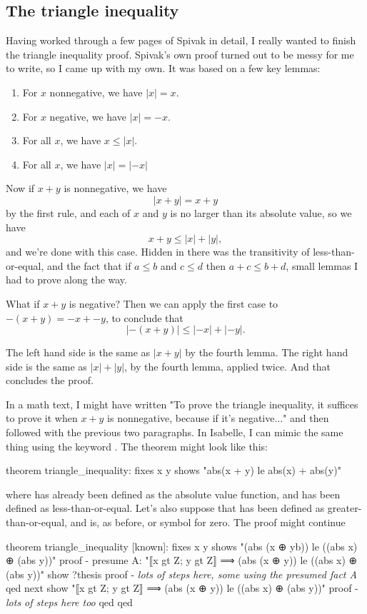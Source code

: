 \subsection{The triangle inequality}
Having worked through a few pages of Spivak in detail, I really wanted to finish the triangle inequality proof. Spivak's own proof turned out to be messy for me to write, so I came up with my own. It was based on a few key lemmas: 
\begin{enumerate}
    \item For $x$ nonnegative, we have $|x| = x$.
    \item For $x$ negative, we have $|x| = -x$.
    \item For all $x$, we have $x \le |x|$.
    \item For all $x$, we have $|x| = |-x|$
\end{enumerate}
Now if $x+y$ is nonnegative, we have
$$
|x+y| = x + y
$$
by the first rule, and each of $x$ and $y$ is no larger than its absolute value, so we have $$
x + y \le |x| + |y|,$$
and we're done with this case. Hidden in there was the transitivity of less-than-or-equal, and the fact that if $a \le b$ and $c \le d$ then $a + c \le b + d$, small lemmas I had to prove along the way. 

What if $x + y$ is negative? Then we can apply the first case to $-(x+y) = -x + -y$, to conclude that 
$$
|-(x+y)| \le |-x| + |-y|.$$

The left hand side is the same as $|x+y|$ by the fourth lemma. The right hand side is the same as $|x| + |y|$, by the fourth lemma, applied twice. And that concludes the proof. 

In a math text, I might have written "To prove the triangle inequality, it suffices to prove it when $x + y$ is nonnegative, because if it's negative..." and then followed with the previous two paragraphs. In Isabelle, I can mimic the same thing using the keyword . The theorem might look like this:
\begin{IS}
theorem triangle_inequality:
  fixes x y
  shows "abs(x + y) le abs(x) + abs(y)"
\end{IS}
where  has already been defined as the absolute value function, and  has been defined as less-than-or-equal. Let's also suppose that  has been defined as greater-than-or-equal, and  is, as before, or symbol for zero. The proof might continue
\begin{IS}
theorem triangle_inequality [known]:
  fixes x y
  shows "(abs (x ⊕ yb)) le  ((abs x)  ⊕ (abs y))"
proof -
  presume A: "⟦x gt Z; y gt Z⟧ ⟹ (abs (x ⊕ y)) le  ((abs x)  ⊕ (abs y))"
  show ?thesis  
  proof -
    \textit{lots of steps here, some using the presumed fact A}
  qed 
next
  show "⟦x gt Z; y gt Z⟧ ⟹ (abs (x ⊕ y)) le  ((abs x)  ⊕ (abs y))"
  proof -
     \textit{lots of steps here too}
  qed
qed
\end{IS}


